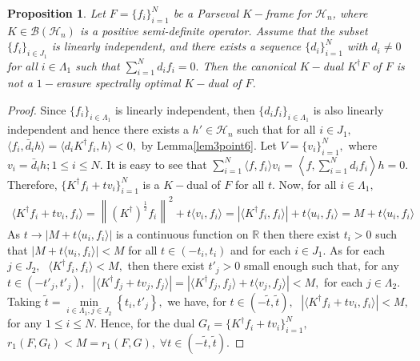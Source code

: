 \documentclass[final,1p,times]{elsarticle}
\newtheorem{prop}[thm]{Proposition}
\begin{document}
	\begin{prop}
Let $F = \{f_i\}_{i=1}^N$ be a Parseval $K-$frame for $\mathcal{H}_n$, where $K \in \mathcal{B}(\mathcal{H}_n)$ is a positive semi-definite operator. Assume that the subset $\{f_i\}_{i \in J_1}$ is linearly independent, and there exists a sequence $\{d_i\}_{i=1}^N$ with $d_i \neq 0$ for all $i \in \Lambda_1$ such that $\sum_{i=1}^N d_i f_i = 0.$ Then the canonical $K-$dual $K^\dag F$ of $F$ is not a $1-$erasure spectrally optimal $K-$dual of $F$.
\end{prop}


	\begin{proof}
		Since $\{f_i\}_{i \in \Lambda_1}$ is linearly independent, then $\{d_i f_i\}_{i \in \Lambda_1}$ is also linearly independent and hence there exists a $h' \in \mathcal{H}_n$ such that for all $i \in J_1,$ $\langle f_i, \bar{d}_i h \rangle = \langle d_i K^\dag f_i, h \rangle < 0,$ by Lemma\ref{lem3point6}. Let $V=\{v_i\}_{i=1}^N,$ where $v_i = \bar{d}_i h;1 \leq i \leq N. $ It is easy to see that $\sum\limits_{i=1}^N \langle f, f_i \rangle v_i = \left \langle f, \sum\limits_{i=1}^N d_i f_i \right \rangle h = 0.$ Therefore, $\{K^\dag f_i + tv_i\}_{i=1}^N$ is a $K-$dual of $F$ for all $t.$ Now, for all $i \in \Lambda_1,$
		\begin{align*}
			\langle K^\dag f_i +tv_i, f_i \rangle  = \left\|\left(K^\dag \right)^{\frac{1}{2}} f_i \right\|^2 +  t\langle v_i, f_i \rangle= \left|	\langle K^\dag f_i, f_i \rangle \right| +t \langle u_i, f_i \rangle = M +  t \langle u_i, f_i \rangle
		\end{align*} 
		As $t \to \left| M+ t \langle u_i, f_i \rangle \right|$ is a  continuous  function on $\mathbb{R}$ then there exist $t_i >0 $ such that  $\left| M+ t \langle u_i, f_i \rangle \right| < M$ for all $t \in (-t_i, t_i)$ and for each $i \in J_1.$ As for each $j \in J_2,\;$ $\langle K^\dag f_i , f_i \rangle < M,$ then there exist $t'_j>0$ small enough such that, for any $t \in (-t'_j, t'_j),\;$  $\left| \langle K^\dag f_j +tv_j, f_j \rangle \right| = \left| \langle K^\dag f_j , f_j \rangle + t \langle v_j, f_j \rangle \right|  <M,$ for each $j \in \Lambda_2.$ Taking $\widetilde{t} = \min\limits_{i \in \Lambda_1, j \in J_2} \left\{t_i, t'_j\right\},$ we have, for $t \in (-\tilde{t}, \tilde{t} ),\;$ $\left| \langle K^\dag f_i +tv_i, f_i \rangle \right| < M,$ for any $1 \leq i \leq N.$ Hence, for the dual $G_t = \{K^\dag f_i + tv_i\}_{i=1}^N ,$\; $r_{1}(F,G_t) <M = r_{1}(F,G),\;\forall t \in  (-\tilde{t}, \tilde{t} ).$
		
	\end{proof}
	
\end{document}
